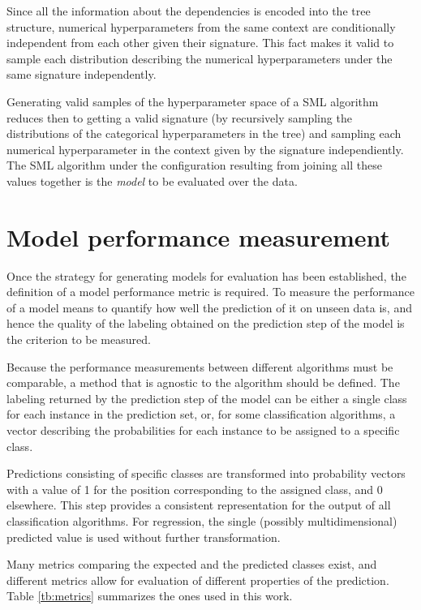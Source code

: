 	Since all the information about the dependencies is encoded into the tree structure, numerical
	hyperparameters from the same context are conditionally independent from each other given their
	signature.  This fact makes it valid to sample each distribution describing the numerical
	hyperparameters under the same signature independently.
	
	Generating valid samples of the hyperparameter space of a SML algorithm reduces then to getting
	a valid signature (by recursively sampling the distributions of the categorical hyperparameters
	in the tree) and sampling each numerical hyperparameter in the context given by the signature
	independiently. The SML algorithm under the configuration resulting from joining all these
	values together is the \emph{model} to be evaluated over the data.

\section{Model performance measurement}
	
	Once the strategy for generating models for evaluation has been established, the definition of a
	model performance metric is required. To measure the performance of a model means to quantify
	how well the prediction of it on unseen data is, and hence the quality of the labeling obtained
	on the prediction step of the model is the criterion to be measured.

	Because the performance measurements between different algorithms must be comparable, a method
	that is agnostic to the algorithm should be defined. The labeling returned by the prediction
	step of the model can be either a single class for each instance in the prediction set,
	or, for some classification algorithms, a vector describing the probabilities for each instance
	to be assigned to a specific class.
	
	Predictions consisting of specific classes are transformed into probability vectors with a value
	of 1 for the position corresponding to the assigned class, and 0 elsewhere. This step provides a
	consistent representation for the output of all classification algorithms. For regression, the
	single (possibly multidimensional) predicted value is used without further transformation.

	Many metrics comparing the expected and the predicted classes exist, and different metrics
	allow for evaluation of different properties of the prediction. Table \ref{tb:metrics}
	summarizes the ones used in this work.

